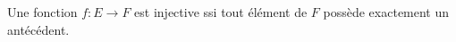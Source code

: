 Une fonction $f : E\to F$ est injective ssi tout élément de $F$ possède exactement un antécédent.

\begin{reponses}
\end{reponses}

